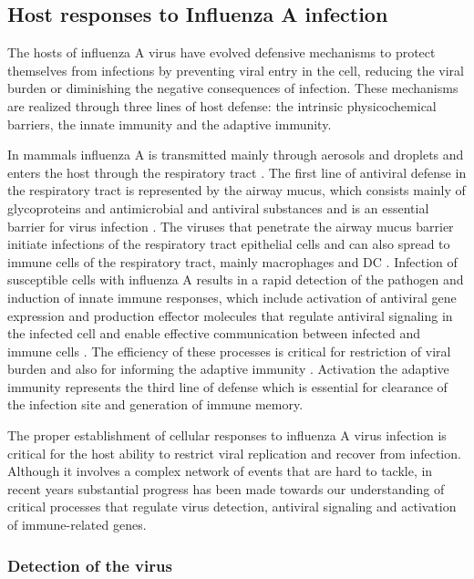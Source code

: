 	
	\subsection{Host responses to Influenza A infection}
	
	The hosts of influenza A virus have evolved defensive mechanisms to protect themselves from infections by preventing viral entry in the cell, reducing the viral burden or diminishing the negative consequences of infection. These mechanisms are realized through three lines of host defense: the intrinsic physicochemical barriers, the innate immunity and the adaptive immunity.
	
	In mammals influenza A is transmitted mainly through aerosols and droplets and enters the host through the respiratory tract \parencite{Brankston2007}. The first line of antiviral defense in the respiratory tract is represented by the airway mucus, which consists mainly of glycoproteins and antimicrobial and antiviral substances and is an essential barrier for virus infection \parencite{Thornton2008, Nicholas2006}. The viruses that penetrate the airway mucus barrier initiate infections of the respiratory tract epithelial cells and can also spread to immune cells of the respiratory tract, mainly macrophages and \gls{DC} \parencite{Perrone2008, Bender1998}. Infection of susceptible cells with influenza A results in a rapid detection of the pathogen and induction of innate immune responses, which include activation of antiviral gene expression and production effector molecules that regulate antiviral signaling in the infected cell and enable effective communication between infected and immune cells \parencite{Iwasaki2014}. The efficiency of these processes is critical for restriction of viral burden and also for informing the adaptive immunity \parencite{Iwasaki2010}. Activation the adaptive immunity represents the third line of defense which is essential for clearance of the infection site and generation of immune memory. 
	
	The proper establishment of cellular responses to influenza A virus infection is critical for the host ability to restrict viral replication and recover from infection. Although it involves a complex network of events that are hard to tackle, in recent years substantial progress has been made towards our understanding of critical processes that regulate virus detection, antiviral signaling and activation of immune-related genes.
	
		\subsubsection{Detection of the virus}
		
